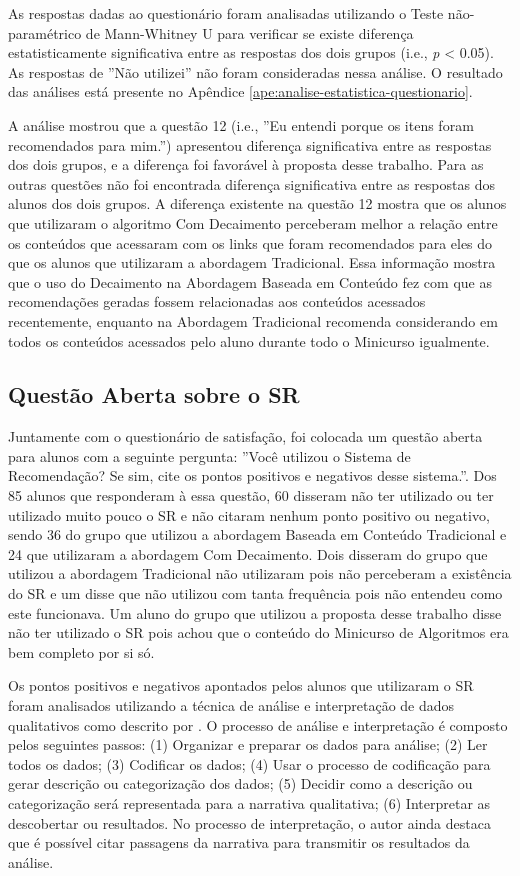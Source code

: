 As respostas dadas ao questionário foram analisadas utilizando o Teste não-paramétrico de
Mann-Whitney U para verificar se existe diferença estatisticamente significativa entre as respostas dos dois grupos (i.e., \textit{p} < 0.05).
As respostas de ''Não utilizei'' não foram consideradas nessa análise. O resultado das análises está presente no Apêndice
\ref{ape:analise-estatistica-questionario}.

A análise mostrou que a questão 12 (i.e., ''Eu entendi porque os itens foram recomendados para mim.'') apresentou
diferença significativa entre as respostas dos dois grupos, e a diferença foi favorável à proposta desse trabalho.
Para as outras questões não foi encontrada diferença significativa entre as respostas dos
alunos dos dois grupos. A diferença existente na questão 12 mostra que os alunos que utilizaram o algoritmo Com
Decaimento perceberam melhor a relação entre os conteúdos que acessaram com os links que foram recomendados para eles
do que os alunos que utilizaram a abordagem Tradicional. Essa informação mostra que o uso do Decaimento na Abordagem
Baseada em Conteúdo fez com que as recomendações geradas fossem relacionadas aos conteúdos acessados recentemente,
enquanto na Abordagem Tradicional recomenda considerando em todos os conteúdos acessados pelo aluno durante todo o Minicurso
igualmente.

\subsection{Questão Aberta sobre o SR}\label{subsection:questao-aberta}

Juntamente com o questionário de satisfação, foi colocada um questão aberta para alunos com a seguinte pergunta:
''Você utilizou o Sistema de Recomendação? Se sim, cite os pontos positivos e negativos desse sistema.''. Dos 85 alunos
que responderam à essa questão, 60 disseram não ter utilizado ou ter utilizado muito pouco o SR
e não citaram nenhum ponto positivo ou negativo, sendo 36 do grupo que utilizou a abordagem Baseada em Conteúdo Tradicional
e 24 que utilizaram a abordagem Com Decaimento. Dois disseram do grupo que utilizou a abordagem Tradicional
não utilizaram pois não perceberam a existência do SR e um disse que não utilizou com tanta frequência
pois não entendeu como este funcionava. Um aluno do grupo que utilizou a proposta desse trabalho disse não ter utilizado
o SR pois achou que o conteúdo do Minicurso de Algoritmos era bem completo por si só.

Os pontos positivos e negativos apontados pelos alunos que utilizaram o SR foram analisados utilizando a técnica de análise
e interpretação de dados qualitativos como descrito por . O processo de análise e interpretação
é composto pelos seguintes passos: (1) Organizar e preparar os dados para análise;
(2) Ler todos os dados; (3) Codificar os dados; (4) Usar o processo de codificação para gerar descrição ou categorização
dos dados; (5) Decidir como a descrição ou categorização será representada para a narrativa qualitativa; (6) Interpretar
as descobertar ou resultados. No processo de interpretação, o autor ainda destaca que é possível citar passagens da narrativa
para transmitir os resultados da análise.

